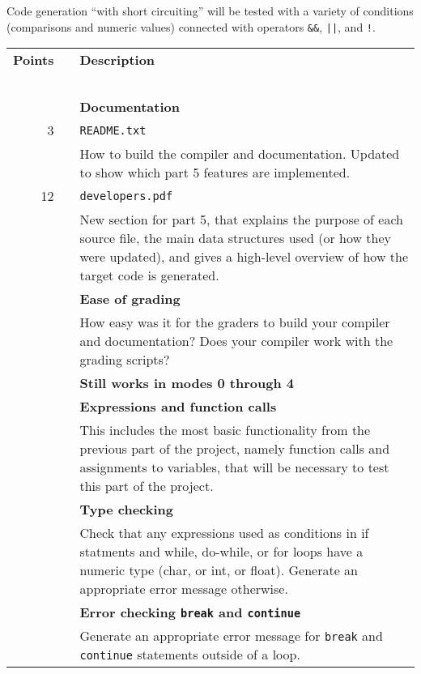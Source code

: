 \documentclass{article}
\makeatletter
\newcommand{\codegen}{4}
\newcommand{\flowgen}{5}
\newcommand{\gradeline}{ \cline{1-2} \cline{4-4} ~\\[-1.5ex] }
\newenvironment{gradetable}{\begin{longtable}{@{~~}rrcp{5in}} \multicolumn{2}{l}{\bf Points} & & {\bf Description}\\ \gradeline}{\end{longtable}}
\newcommand{\mainitem}[2]{\pagebreak[2] {\bf #1} &&& {\bf #2}}
\newcommand{\mainpara}[1]{~ &&& {#1} }
\newcommand{\inneritem}[2]{~ & #1 && #2}
\newcommand{\innerpara}[1]{~ & ~ && #1}
\makeatother
\begin{document}
Code generation ``with short circuiting''
will be tested with a variety of conditions
(comparisons and numeric values)
connected with operators \verb|&&|, \verb+||+, and \verb|!|.


\noindent
\begin{gradetable}
  \mainitem{15}{Documentation}
  \\[1mm]
  \inneritem{3}{\tt README.txt}
  \\[1mm]
  \innerpara{%
    How to build the compiler and documentation.
    Updated to show which part \flowgen{} features are implemented.
  }
  \\[1mm]
  \inneritem{12}{\tt developers.pdf}
  \\[1mm]
  \innerpara{%
    New section for part \flowgen{}, that explains
    the purpose of each source file,
    the main data structures used (or how they were updated),
    and gives a high-level overview of how the target code
    is generated.
  }
  \\[4mm]

  \mainitem{7}{Ease of grading}
  \\[1mm]
  \innerpara{%
    How easy was it for the graders to build your compiler and
    documentation?
    Does your compiler work with the grading scripts?
  }
  \\[4mm]

  \mainitem{8}{Still works in modes 0 through \codegen}
  \\[4mm]

  \mainitem{15}{Expressions and function calls}
  \\[1mm]
  \mainpara{%
    This includes the most basic functionality from the previous part of the
    project, namely function calls and assignments to variables,
    that will be necessary to test this part of the project.
  }
  \\[4mm]

  \mainitem{5}{Type checking}
  \\[1mm]
  \mainpara{%
    Check that any expressions used as conditions in if statments
    and while, do-while, or for loops
    have a numeric type (char, or int, or float).
    Generate an appropriate error message otherwise.
  }
  \\[4mm]

  \mainitem{5}{Error checking {\tt break} and {\tt continue}}
  \\[1mm]
  \mainpara{%
    Generate an appropriate error message for {\tt break} and {\tt continue}
    statements outside of a loop.
  }
  \\[4mm]



\end{gradetable}
\end{document}
